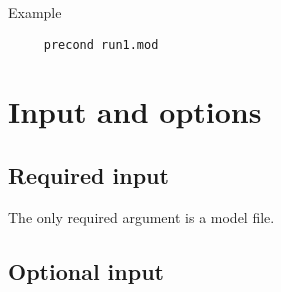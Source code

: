 Example 

\begin{verbatim}
     precond run1.mod
\end{verbatim}

\section{Input and options}

\subsection{Required input}
The only required argument is a model file.

\subsection{Optional input}

